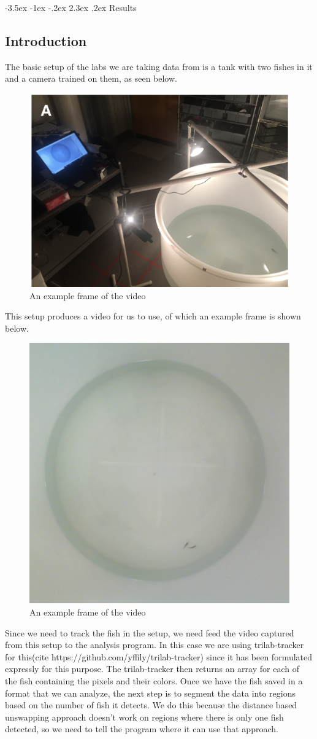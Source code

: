 \documentclass{article}
\makeatletter
\renewcommand\section{\clearpage\newpage\@startsection {section}{1}{\z@}%
	{-3.5ex \@plus -1ex \@minus -.2ex}%
	{2.3ex \@plus.2ex}%
	{\normalfont\Large\bfseries}}
\makeatother
\begin{document}
\section{Results}

\subsection{Introduction}
The basic setup of the labs we are taking data from is a tank with two fishes in it and a camera trained on them, as seen below.

\begin{figure}[H]
	\centering
	\includegraphics[width=.5\linewidth]{experimental_design}
	\caption{An example frame of the video}
\end{figure}


This setup produces a video for us to use, of which an example frame is shown below.

\begin{figure}[H]
	\centering
	\includegraphics[width=.5\linewidth]{figures.frame5140}
	\caption{An example frame of the video}
\end{figure}

Since we need to track the fish in the setup, we need feed the video captured from this setup to the analysis program. In this case we are using trilab-tracker for this(cite https://github.com/yffily/trilab-tracker) since it has been formulated expressly for this purpose. The trilab-tracker then returns an array for each of the fish containing the pixels and their colors. Once we have the fish saved in a format that we can analyze, the next step is to segment the data into regions based on the number of fish it detects. We do this because the distance based unswapping approach doesn't work on regions where there is only one fish detected, so we need to tell the program where it can use that approach.
\end{document}
